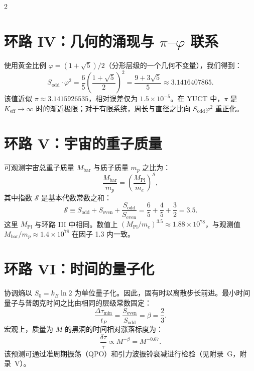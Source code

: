 \documentclass[12pt,a4paper]{article}
\newcommand{\Keff}{K_{\mathrm{eff}}}
\begin{document}
	\begin{multicols}{2}
		\section{环路 IV：几何的涌现与 \(\pi\)–\(\varphi\) 联系}
		
		使用黄金比例 \(\varphi = (1+\sqrt{5})/2\)（分形层级的一个几何不变量），我们得到：
		\begin{equation}
			S_{\mathrm{odd}} \cdot \varphi^2 = \frac{6}{5} \left( \frac{1+\sqrt{5}}{2} \right)^2 = \frac{9+3\sqrt{5}}{5} \approx 3.1416407865.
		\end{equation}
		该值近似 \(\pi \approx 3.1415926535\)，相对误差仅为 \(1.5 \times 10^{-5}\)。在 YUCT 中，\(\pi\) 是 \(\Keff \to \infty\) 时的渐近极限；对于有限系统，周长与直径之比向 \(S_{\mathrm{odd}}\varphi^2\) 重正化。
		
		\section{环路 V：宇宙的重子质量}
		
		可观测宇宙总重子质量 \(M_{\mathrm{bar}}\) 与质子质量 \(m_p\) 之比为：
		\begin{equation}
			\frac{M_{\mathrm{bar}}}{m_p} = \left( \frac{M_{\mathrm{Pl}}}{m_e} \right)^{\mathcal{S}},
		\end{equation}
		其中指数 \(\mathcal{S}\) 是基本代数常数之和：
		\begin{equation}
			\mathcal{S} \equiv S_{\mathrm{odd}} + S_{\mathrm{even}} + \frac{S_{\mathrm{odd}}}{S_{\mathrm{even}}} = \frac{6}{5} + \frac{4}{5} + \frac{3}{2} = 3.5.
		\end{equation}
		这里 \(M_{\mathrm{Pl}}\) 与环路 III 中相同。数值上 \((M_{\mathrm{Pl}}/m_e)^{3.5} \approx 1.88 \times 10^{78}\)，与观测值 \(M_{\mathrm{bar}}/m_p \approx 1.4 \times 10^{78}\) 在因子 1.3 内一致。
		
		\section{环路 VI：时间的量子化}
		
		协调熵以 \(S_0 = k_B \ln 2\) 为单位量子化。因此，固有时以离散步长前进。最小时间量子与普朗克时间之比由相同的层级常数固定：
		\begin{equation}
			\boxed{\frac{\Delta \tau_{\min}}{t_P} = \frac{S_{\mathrm{even}}}{S_{\mathrm{odd}}} = \beta = \frac{2}{3}}.
		\end{equation}
		宏观上，质量为 \(M\) 的黑洞的时间相对涨落标度为：
		\begin{equation}
			\frac{\delta \tau}{\tau} \propto M^{-\beta} = M^{-0.67}.
		\end{equation}
		该预测可通过准周期振荡（QPO）和引力波振铃衰减进行检验（见附录~G，附录~V）。
		

\end{multicols}
\end{document}
